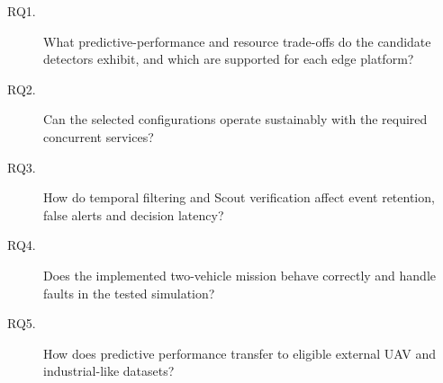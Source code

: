 \begin{description}
\item[RQ1.] What predictive-performance and resource trade-offs do the candidate detectors exhibit, and which are supported for each edge platform?
\item[RQ2.] Can the selected configurations operate sustainably with the required concurrent services?
\item[RQ3.] How do temporal filtering and Scout verification affect event retention, false alerts and decision latency?
\item[RQ4.] Does the implemented two-vehicle mission behave correctly and handle faults in the tested simulation?
\item[RQ5.] How does predictive performance transfer to eligible external UAV and industrial-like datasets?
\end{description}

